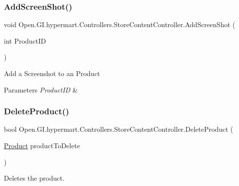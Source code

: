 \subsubsection{\texorpdfstring{Add\+Screen\+Shot()}{AddScreenShot()}}
{\footnotesize\ttfamily void Open.\+G\+I.\+hypermart.\+Controllers.\+Store\+Content\+Controller.\+Add\+Screen\+Shot (\begin{DoxyParamCaption}\item[{int}]{Product\+ID }\end{DoxyParamCaption})}



Add a Screenshot to an Product 


\begin{DoxyParams}{Parameters}
{\em Product\+ID} & \\
\hline
\end{DoxyParams}
\hypertarget{class_open_1_1_g_i_1_1hypermart_1_1_controllers_1_1_store_content_controller_a3e98139b9c8d95c6afb1bbe699aff201}{}\label{class_open_1_1_g_i_1_1hypermart_1_1_controllers_1_1_store_content_controller_a3e98139b9c8d95c6afb1bbe699aff201} 
\subsubsection{\texorpdfstring{Delete\+Product()}{DeleteProduct()}\hspace{0.1cm}{\footnotesize\ttfamily [1/2]}}
{\footnotesize\ttfamily bool Open.\+G\+I.\+hypermart.\+Controllers.\+Store\+Content\+Controller.\+Delete\+Product (\begin{DoxyParamCaption}\item[{\hyperlink{class_open_1_1_g_i_1_1hypermart_1_1_models_1_1_product}{Product}}]{product\+To\+Delete }\end{DoxyParamCaption})}



Deletes the product. 


